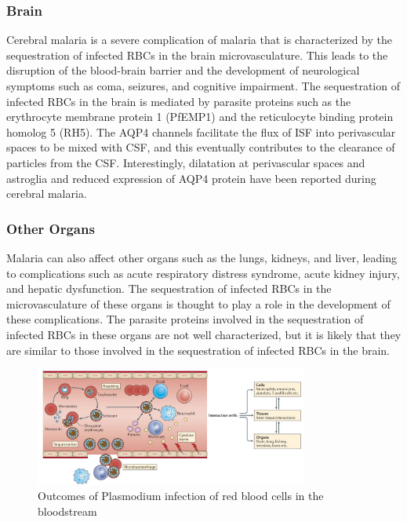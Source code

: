 \documentclass[twoside]{article}
\begin{document}
\begin{multicols}{2}
    \subsubsection*{Brain}
    Cerebral malaria is a severe complication of malaria that is characterized by the sequestration of infected RBCs in the brain microvasculature.
    This leads to the disruption of the blood-brain barrier and the development of neurological symptoms such as coma, seizures, and
    cognitive impairment. The sequestration of infected RBCs in the brain is mediated by parasite proteins such as the erythrocyte membrane protein 1 (PfEMP1)
    and the reticulocyte binding protein homolog 5 (RH5).
    The AQP4 channels facilitate the flux of ISF into perivascular spaces to be mixed with CSF, 
    and this eventually contributes to the clearance of particles from the CSF.
    Interestingly, dilatation at perivascular spaces and astroglia and reduced expression of AQP4 protein have been reported during cerebral malaria.
   
    \subsubsection*{Other Organs}
    Malaria can also affect other organs such as the lungs, kidneys, and liver, leading to complications such as acute respiratory distress syndrome,
    acute kidney injury, and hepatic dysfunction. The sequestration of infected RBCs in the microvasculature of these organs is thought to play a role in the development of these complications.
    The parasite proteins involved in the sequestration of infected RBCs in these organs are not well characterized, but it is likely that they are similar to those involved in the sequestration of infected RBCs in the brain.


\end{multicols}

\begin{figure}[H]
    \centering
    \includegraphics[width=0.8\textwidth]{bloodstream.jpg}
    \caption{Outcomes of Plasmodium infection of red blood cells in the bloodstream}
    \label{fig: Outcomes of Plasmodium infection of red blood cells in the bloodstream}
\end{figure}
\end{document}
